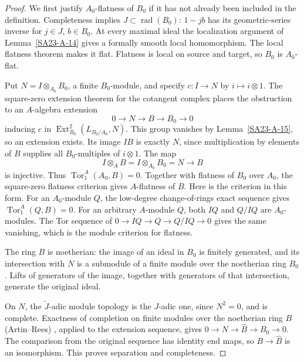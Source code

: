 \begin{proof}
We first justify $A_0$-flatness of $B_0$ if it has not already been
included in the definition. Completeness implies
$J\subset\operatorname{rad}(B_0)$: $1-jb$ has its geometric-series
inverse for $j\in J$, $b\in B_0$. At every maximal ideal the
localization argument of Lemma~\ref{SA23-A-14} gives a formally
smooth local homomorphism. The local flatness theorem
\cite[Proposition 15.41.5]{rootStacksRegular} makes it flat.
Flatness is local on source and target, so $B_0$ is $A_0$-flat.

Put $N=I\otimes_{A_0}B_0$, a finite $B_0$-module, and specify
$c:I\to N$ by $i\mapsto i\otimes1$. The square-zero extension
theorem for the cotangent complex
\cite[Lemma 92.16.1]{rootStacksDeformations} places the obstruction
to an $A$-algebra extension
\[
 0\longrightarrow N\longrightarrow B\longrightarrow B_0
       \longrightarrow0
\]
inducing $c$ in $\operatorname{Ext}^2_{B_0}(L_{B_0/A_0},N)$.
This group vanishes by Lemma~\ref{SA23-A-15}, so an extension
exists. Its image $IB$ is exactly $N$, since multiplication by
elements of $B$ supplies all $B_0$-multiples of $i\otimes1$.
The map
\[
 I\otimes_A B=I\otimes_{A_0}B_0=N\longrightarrow B
\]
is injective. Thus $\operatorname{Tor}_1^A(A_0,B)=0$.
Together with flatness of $B_0$ over $A_0$, the square-zero
flatness criterion gives $A$-flatness of $B$. Here is the criterion
in this form. For an $A_0$-module $Q$, the low-degree
change-of-rings exact sequence gives
$\operatorname{Tor}_1^A(Q,B)=0$. For an arbitrary $A$-module $Q$,
both $IQ$ and $Q/IQ$ are $A_0$-modules. The Tor sequence of
$0\to IQ\to Q\to Q/IQ\to0$ gives the same vanishing, which is
the module criterion for flatness.

The ring $B$ is noetherian: the image of an ideal in $B_0$ is
finitely generated, and its intersection with $N$ is a submodule
of a finite module over the noetherian ring $B_0$. Lifts of
generators of the image, together with generators of that
intersection, generate the original ideal.

On $N$, the $\widetilde J$-adic module topology is the $J$-adic
one, since $N^2=0$, and is complete. Exactness of completion on
finite modules over the noetherian ring $B$ (Artin--Rees)
\cite[Lemma 10.97.1]{rootStacksNoetherianCompletion}, applied
to the extension sequence, gives
$0\to N\to\widehat B\to B_0\to0$. The comparison from the
original sequence has identity end maps, so
$B\to\widehat B$ is an isomorphism. This proves separation
and completeness.


\end{proof}
